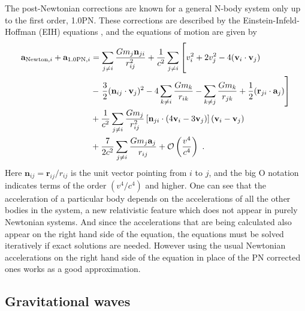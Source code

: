 \documentclass[english, oneside]{HYgradu}
\begin{document}
The post-Newtonian corrections are known for a general N-body system only up to the first order, 1.0PN. These corrections are described by the Einstein-Infeld-Hoffman (EIH) equations \citep{einstein:1938}, and the equations of motion are given by
\begin{align}
\mathbf{a}_{\mathrm{Newton},i} + \mathbf{a}_{\mathrm{1.0PN}, i} &= \sum_{j \neq i} \frac{G m_j \mathbf{n}_{ji}}{r_{ij}^2} + \frac{1}{c^2} \sum_{j \neq i} \left[ \vphantom{\sum_{k \neq j} \frac{G m_k}{r_{jk}}} v_i^2 + 2 v_j^2 - 4(\mathbf{v}_i \cdot \mathbf{v}_j) \right. \nonumber \\
&- \left. \frac{3}{2}(\mathbf{n}_{ij} \cdot \mathbf{v}_j)^2 - 4 \sum_{k \neq i} \frac{G m_k}{r_{ik}} - \sum_{k \neq j} \frac{G m_k}{r_{jk}} + \frac{1}{2} (\mathbf{r}_{ji} \cdot \mathbf{a}_j) \right] \nonumber \\
&+ \frac{1}{c^2} \sum_{j \neq i} \frac{G m_j}{r_{ij}^2} \left[ \mathbf{n}_{ji} \cdot (4 \mathbf{v}_i - 3 \mathbf{v}_j) \right] (\mathbf{v}_i - \mathbf{v}_j) \nonumber \\
&+ \frac{7}{2c^2} \sum_{j \neq i} \frac{G m_j \mathbf{a}_j}{r_{ij}} + \mathcal{O} \left( \frac{v^4}{c^4} \right) \ .
\end{align}
Here $\mathbf{n}_{ij} = \mathbf{r}_{ij}/r_{ij}$ is the unit vector pointing from $i$ to $j$, and the big O notation indicates terms of the order $(v^4/c^4)$ and higher. One can see that the acceleration of a particular body depends on the accelerations of all the other bodies in the system, a new relativistic feature which does not appear in purely Newtonian systems. And since the accelerations that are being calculated also appear on the right hand side of the equation, the equations must be solved iteratively if exact solutions are needed. However using the usual Newtonian accelerations on the right hand side of the equation in place of the PN corrected ones works as a good approximation.

\subsection{Gravitational waves}
\end{document}

